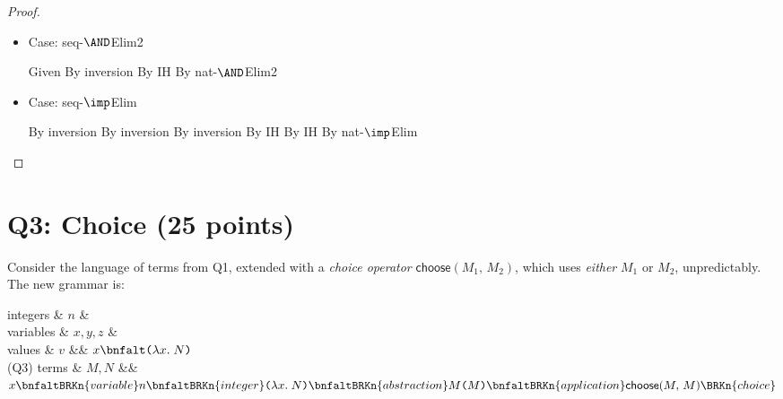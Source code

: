 {\begin{proof}
\begin{itemize}
  \item Case: seq-$\AND$Elim2

    \begin{llproof}
        {Given}
        {By inversion}
        {By IH}
        {By nat-$\AND$Elim2}
    \end{llproof}


  \item Case: seq-$\imp$Elim

    \begin{llproof}
        {By inversion}
        {By inversion}
        {By inversion}
       {By IH}
       {By IH}
        {By nat-$\imp$Elim}
    \end{llproof}

\vfill
  \end{itemize}
\end{proof}



}  %

\clearpage

\section{Q3: Choice (25 points)}
\newcommand{\DC}[2]{\textsf{choose}({#1},\,{#2})}

Consider the language of terms from Q1, extended with
a \emph{choice operator} $\DC{M_1}{M_2}$, which uses \emph{either} $M_1$ or $M_2$,
unpredictably.
The new grammar is:

\begin{grammar}
integers & $n$ &
\\
variables & $x, y, z$ &
 \\
values & $v$
   &\bnfas&
   $x \bnfalt \lcabs{x}{N}
   $
\\
(Q3) terms  & $M, N$ &\bnfas&
      $x
      \bnfaltBRKn{variable}
      n
      \bnfaltBRKn{integer}
      \lcabs{x}{N}
      \bnfaltBRKn{abstraction}
      M\texttt(M\texttt)
      \bnfaltBRKn{application}
      \DC{M}{M}
      \BRKn{choice}
      $
\end{grammar}


